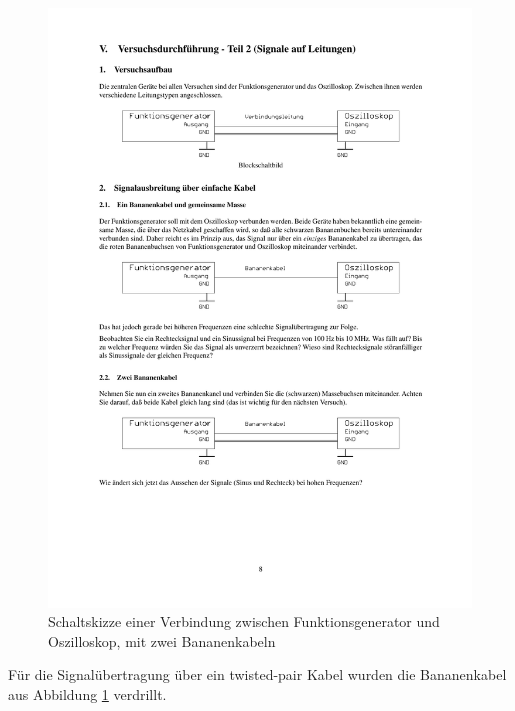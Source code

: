 \documentclass[12pt,a4paper]{article}
\begin{document}
\begin{figure}[H] 
  \centering
    \includegraphics[trim = 10mm 70mm 10mm 200mm, clip, scale = 1]{2_0-2_2.pdf}
  	\caption[Schaltskizze einer Verbindung zwischen Funktionsgenerator und Oszilloskop, mit zwei Bananenkabeln]{Schaltskizze einer Verbindung zwischen Funktionsgenerator und Oszilloskop, mit zwei Bananenkabeln\footnotemark}
  \label{fig:2.2}
\end{figure}


Für die Signalübertragung über ein twisted-pair Kabel wurden die Bananenkabel aus Abbildung \ref{fig:2.2} verdrillt.
\end{document}
